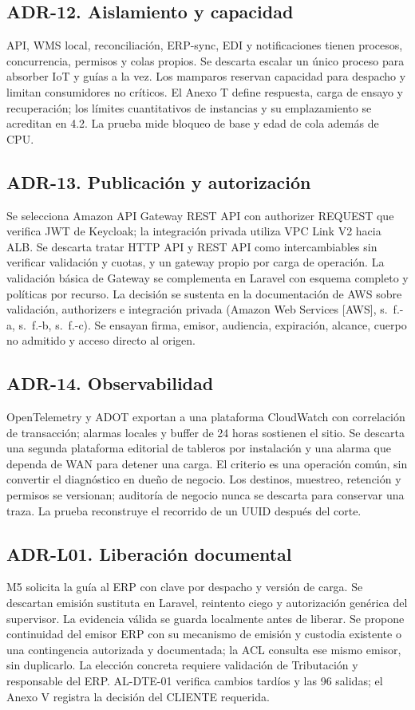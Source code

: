 \subsection*{ADR-12. Aislamiento y capacidad}
API, WMS local, reconciliación, ERP-sync, EDI y notificaciones tienen procesos, concurrencia, permisos y colas propios. Se descarta escalar un único proceso para absorber IoT y guías a la vez. Los mamparos reservan capacidad para despacho y limitan consumidores no críticos. El Anexo T define respuesta, carga de ensayo y recuperación; los límites cuantitativos de instancias y su emplazamiento se acreditan en 4.2. La prueba mide bloqueo de base y edad de cola además de CPU.

\subsection*{ADR-13. Publicación y autorización}
Se selecciona Amazon API Gateway REST API con authorizer REQUEST que verifica JWT de Keycloak; la integración privada utiliza VPC Link V2 hacia ALB. Se descarta tratar HTTP API y REST API como intercambiables sin verificar validación y cuotas, y un gateway propio por carga de operación. La validación básica de Gateway se complementa en Laravel con esquema completo y políticas por recurso. La decisión se sustenta en la documentación de AWS sobre validación, authorizers e integración privada (Amazon Web Services [AWS], s.~f.-a, s.~f.-b, s.~f.-c). Se ensayan firma, emisor, audiencia, expiración, alcance, cuerpo no admitido y acceso directo al origen.

\subsection*{ADR-14. Observabilidad}
OpenTelemetry y ADOT exportan a una plataforma CloudWatch con correlación de transacción; alarmas locales y buffer de 24 horas sostienen el sitio. Se descarta una segunda plataforma editorial de tableros por instalación y una alarma que dependa de WAN para detener una carga. El criterio es una operación común, sin convertir el diagnóstico en dueño de negocio. Los destinos, muestreo, retención y permisos se versionan; auditoría de negocio nunca se descarta para conservar una traza. La prueba reconstruye el recorrido de un UUID después del corte.

\subsection*{ADR-L01. Liberación documental}
M5 solicita la guía al ERP con clave por despacho y versión de carga. Se descartan emisión sustituta en Laravel, reintento ciego y autorización genérica del supervisor. La evidencia válida se guarda localmente antes de liberar. Se propone continuidad del emisor ERP con su mecanismo de emisión y custodia existente o una contingencia autorizada y documentada; la ACL consulta ese mismo emisor, sin duplicarlo. La elección concreta requiere validación de Tributación y responsable del ERP. AL-DTE-01 verifica cambios tardíos y las 96 salidas; el Anexo V registra la decisión del CLIENTE requerida.

